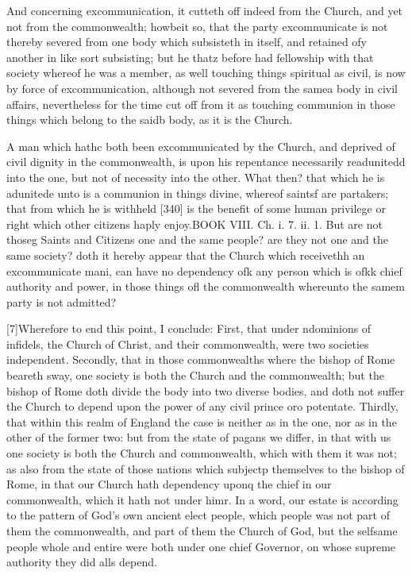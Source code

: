 And concerning excommunication, it cutteth off indeed from the Church, and yet not from the commonwealth; howbeit so, that the party excommunicate is not thereby severed from one body which subsisteth in itself, and retained ofy another in like sort subsisting; but he thatz before had fellowship with that society whereof he was a member, as well touching things spiritual as civil, is now by force of excommunication, although not severed from the samea body in civil affairs, nevertheless for the time cut off from it as touching communion in those things which belong to the saidb body, as it is the Church.

A man which hathc both been excommunicated by the Church, and deprived of civil dignity in the commonwealth, is upon his repentance necessarily readunitedd into the one, but not of necessity into the other. What then? that which he is adunitede unto is a communion in things divine, whereof saintsf are partakers; that from which he is withheld [340] is the benefit of some human privilege or right which other citizens haply enjoy.BOOK VIII. Ch. i. 7. ii. 1. But are not thoseg Saints and Citizens one and the same people? are they not one and the same society? doth it hereby appear that the Church which receivethh an excommunicate mani, can have no dependency ofk any person which is ofkk chief authority and power, in those things ofl the commonwealth whereunto the samem party is not admitted?

[7]Wherefore to end this point, I conclude: First, that under ndominions of infidels, the Church of Christ, and their commonwealth, were two societies independent. Secondly, that in those commonwealths where the bishop of Rome beareth sway, one society is both the Church and the commonwealth; but the bishop of Rome doth divide the body into two diverse bodies, and doth not suffer the Church to depend upon the power of any civil prince oro potentate. Thirdly, that within this realm of England the case is neither as in the one, nor as in the other of the former two: but from the state of pagans we differ, in that with us one society is both the Church and commonwealth, which with them it was not; as also from the state of those nations which subjectp themselves to the bishop of Rome, in that our Church hath dependency uponq the chief in our commonwealth, which it hath not under himr. In a word, our estate is according to the pattern of God’s own ancient elect people, which people was not part of them the commonwealth, and part of them the Church of God, but the selfsame people whole and entire were both under one chief Governor, on whose supreme authority they did alls depend.


